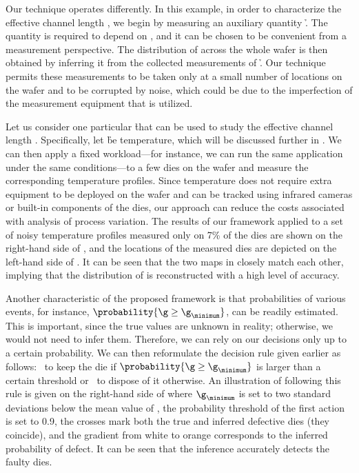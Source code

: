 Our technique operates differently. In this example, in order to characterize
the effective channel length \g, we begin by measuring an auxiliary quantity \h.
The quantity is required to depend on \g, and it can be chosen to be convenient
from a measurement perspective. The distribution of \g across the whole wafer is
then obtained by inferring it from the collected measurements of \h. Our
technique permits these measurements to be taken only at a small number of
locations on the wafer and to be corrupted by noise, which could be due to the
imperfection of the measurement equipment that is utilized.

Let us consider one particular \h that can be used to study the effective
channel length \g. Specifically, let \h be temperature, which will be discussed
further in . We can then apply a fixed workload---for
instance, we can run the same application under the same conditions---to a few
dies on the wafer and measure the corresponding temperature profiles. Since
temperature does not require extra equipment to be deployed on the wafer and can
be tracked using infrared cameras \cite{mesa-martinez2007} or built-in
components of the dies, our approach can reduce the costs associated with
analysis of process variation. The results of our framework applied to a set of
noisy temperature profiles measured only on 7\% of the dies are shown on the
right-hand side of , and the locations of
the measured dies are depicted on the left-hand side of
. It can be seen that the two maps in
 closely match each other, implying that the
distribution of \g is reconstructed with a high level of accuracy.

Another characteristic of the proposed framework is that probabilities of
various events, for instance, $\probability{\g \geq \g_\minimum}$, can be
readily estimated. This is important, since the true values are unknown in
reality; otherwise, we would not need to infer them. Therefore, we can rely on
our decisions only up to a certain probability. We can then reformulate the
decision rule given earlier as follows: \one~to keep the die if $\probability{\g
\geq \g_\minimum}$ is larger than a certain threshold or \two~to dispose of it
otherwise. An illustration of following this rule is given on the right-hand
side of  where $\g_\minimum$ is set to two
standard deviations below the mean value of \g, the probability threshold of the
first action is set to 0.9, the crosses mark both the true and inferred
defective dies (they coincide), and the gradient from white to orange
corresponds to the inferred probability of defect. It can be seen that the
inference accurately detects the faulty dies.

